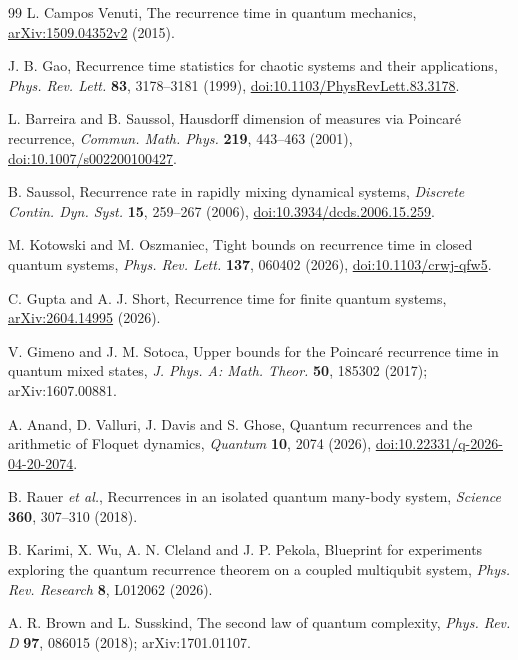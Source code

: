 \begin{thebibliography}{99}
L. Campos Venuti,
The recurrence time in quantum mechanics,
\href{https://arxiv.org/abs/1509.04352}{arXiv:1509.04352v2} (2015).

J. B. Gao,
Recurrence time statistics for chaotic systems and their applications,
\emph{Phys. Rev. Lett.} \textbf{83}, 3178--3181 (1999),
\href{https://doi.org/10.1103/PhysRevLett.83.3178}%
{doi:10.1103/PhysRevLett.83.3178}.

L. Barreira and B. Saussol,
Hausdorff dimension of measures via Poincar\'e recurrence,
\emph{Commun. Math. Phys.} \textbf{219}, 443--463 (2001),
\href{https://doi.org/10.1007/s002200100427}%
{doi:10.1007/s002200100427}.

B. Saussol,
Recurrence rate in rapidly mixing dynamical systems,
\emph{Discrete Contin. Dyn. Syst.} \textbf{15}, 259--267 (2006),
\href{https://doi.org/10.3934/dcds.2006.15.259}%
{doi:10.3934/dcds.2006.15.259}.

M. Kotowski and M. Oszmaniec,
Tight bounds on recurrence time in closed quantum systems,
\emph{Phys. Rev. Lett.} \textbf{137}, 060402 (2026),
\href{https://doi.org/10.1103/crwj-qfw5}{doi:10.1103/crwj-qfw5}.

C. Gupta and A. J. Short,
Recurrence time for finite quantum systems,
\href{https://arxiv.org/abs/2604.14995}{arXiv:2604.14995} (2026).

V. Gimeno and J. M. Sotoca,
Upper bounds for the Poincar\'e recurrence time in quantum mixed states,
\emph{J. Phys. A: Math. Theor.} \textbf{50}, 185302 (2017);
arXiv:1607.00881.

A. Anand, D. Valluri, J. Davis and S. Ghose,
Quantum recurrences and the arithmetic of Floquet dynamics,
\emph{Quantum} \textbf{10}, 2074 (2026),
\href{https://doi.org/10.22331/q-2026-04-20-2074}%
{doi:10.22331/q-2026-04-20-2074}.

B. Rauer \emph{et al.},
Recurrences in an isolated quantum many-body system,
\emph{Science} \textbf{360}, 307--310 (2018).

B. Karimi, X. Wu, A. N. Cleland and J. P. Pekola,
Blueprint for experiments exploring the quantum recurrence theorem on a
coupled multiqubit system,
\emph{Phys. Rev. Research} \textbf{8}, L012062 (2026).

A. R. Brown and L. Susskind,
The second law of quantum complexity,
\emph{Phys. Rev. D} \textbf{97}, 086015 (2018);
arXiv:1701.01107.


\end{thebibliography}
